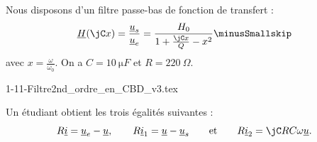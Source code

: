%
\initialisationPartieGauche %
Nous disposons d'un filtre passe-bas de fonction de transfert : \minusSmallskip
\[
\underline{H}(\jC x)= \frac{\underline{u}_s}{\underline{u}_e} = \frac{H_0}{1+\frac{\jC x}{Q}-x^2} \minusSmallskip
\]
avec $x=\frac{\omega}{\omega_0}$. On a $C=\SI{10}{\micro F}$ et $R=\SI{220}{ \Omega}$.

\initialisationPartieDroite %
\begin{center}
	{1-11-Filtre2nd_ordre_en_CBD_v3.tex}	
\end{center}

\finalisationDuPartageDePage %

\minusMedskip

	 Un étudiant obtient les trois égalités suivantes : 
	 \[
	 R\underline{i}  =  \underline{u}_e-\underline{u}, \qquad		
	R\underline{i}_1  =  \underline{u}-\underline{u}_s\qquad \text{et}\qquad 
 		R\underline{i}_2  =  \jC RC\omega \underline{u}.
		\]

\minusBigskip

\debutEntrainement



